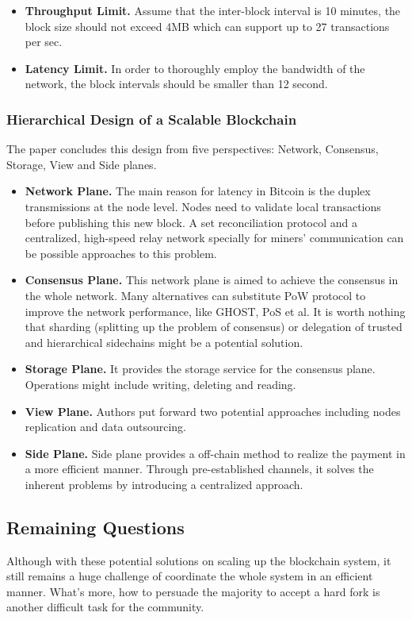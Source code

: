 \documentclass[conference]{IEEEtran}
\begin{document}
\begin{itemize}
    \item \textbf{Throughput Limit.} Assume that the inter-block interval is 10 minutes, the block size should not exceed 4MB which can support up to 27 transactions per sec.
    \item \textbf{Latency Limit.} In order to thoroughly employ the bandwidth of the network, the block intervals should be smaller than 12 second.
\end{itemize}

\subsubsection{Hierarchical Design of a Scalable Blockchain}
The paper concludes this design from five perspectives: Network, Consensus, Storage, View and Side planes.

\begin{itemize}
    \item \textbf{Network Plane.} The main reason for latency in Bitcoin is the duplex transmissions at the node level. 
    Nodes need to validate local transactions before publishing this new block.
    A set reconciliation protocol and a centralized, high-speed relay network specially for miners' communication can be possible approaches to this problem.
    \item \textbf{Consensus Plane.} This network plane is aimed to achieve the consensus in the whole network. 
    Many alternatives can substitute PoW protocol to improve the network performance, like GHOST, PoS et al.
    It is worth nothing that sharding (splitting up the problem of consensus) or delegation of trusted and hierarchical sidechains might be a potential solution.
    \item \textbf{Storage Plane.} It provides the storage service for the consensus plane. Operations might include writing, deleting and reading.
    \item \textbf{View Plane.} Authors put forward two potential approaches including nodes replication and data outsourcing.
    \item \textbf{Side Plane.} Side plane provides a off-chain method to realize the payment in a more efficient manner. 
    Through pre-established channels, it solves the inherent problems by introducing a centralized approach.
\end{itemize}

\subsection{Remaining Questions}
Although with these potential solutions on scaling up the blockchain system, it still remains a huge challenge of coordinate the whole system in an efficient manner.
%
What's more, how to persuade the majority to accept a hard fork is another difficult task for the community. 



\end{document}

